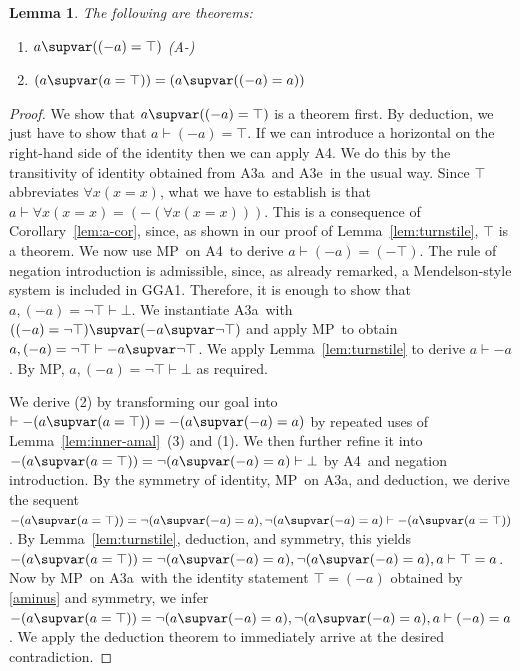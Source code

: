 \documentclass{preprint}
\makeatletter
\newtheorem{lemma}[theorem]{Lemma}
\newcommand{\GGA}{\textsf{GGA1}}
\newcommand{\iiia}{A3a}%
\newcommand{\iiie}{A3e}%
\newcommand{\iv}{A4}%
\renewcommand{\mp}{MP}%
\renewcommand{\to}{\supvar}
\newcommand\mytag[2][]{%
	\def\@currentlabel{#2}%
	(#2)\label{#1} %
}
\makeatother
\begin{document}
\begin{lemma} \label{lem:admissible} 
	The following are theorems:
	\begin{enumerate}
		\item $a \to ((- a) = \top)$ \mytag[aminus]{A-}%
		\item $(a \to (a = \top)) = (a \to ((-a) = a))$ 
	\end{enumerate}
\end{lemma}
\begin{proof}
	We show that $a \to ((- a) = \top)$ is a theorem first. 
	By deduction, we just have to show that $a \vdash (-a) = \top$. If we can introduce a horizontal on the right-hand side of the identity then we can apply \iv. 
	We do this by the transitivity of identity obtained from \iiia~and \iiie~in the usual way. 
	Since $\top$ abbreviates $\forall x (x = x)$, what we have to establish is that $a \vdash \forall x (x = x) = (-(\forall x (x = x)))$. This is a consequence of Corollary~\ref{lem:a-cor}, since, as shown in our proof of Lemma~\ref{lem:turnstile}, $\top$ is a theorem. 
	We now use \mp~on \iv~to derive $a \vdash (-a) = (-\top)$. 
	The rule of negation introduction is admissible, since, as already remarked, a Mendelson-style system is included in {\GGA}. 
	Therefore, it is enough to show that $a, (-a) = \neg \top \vdash \bot$. 
	We instantiate \iiia~with $((-a) = \neg \top) \to (-a \to \neg \top)$ and apply \mp~to obtain $a, (-a) = \neg \top \vdash -a \to \neg \top$. We apply Lemma~\ref{lem:turnstile} to derive $a \vdash -a$. By \mp, $a, (-a) = \neg \top \vdash \bot$ as required. 
	
	
	We derive (2) by transforming our goal into $\vdash -(a \to (a = \top)) = -(a \to (-a) = a)$ by repeated uses of Lemma~\ref{lem:inner-amal}~(3) and (1). We then further refine it into $-(a \to (a = \top)) = \neg (a \to (-a) = a) \vdash \bot $ by \iv~and negation introduction. By the symmetry of identity, \mp~on \iiia, and deduction, we derive the sequent $-(a \to (a = \top)) = \neg (a \to (-a) = a), \neg (a \to (-a) = a) \vdash -(a \to (a = \top))$. By Lemma~\ref{lem:turnstile}, deduction, and symmetry, this yields~$-(a \to (a = \top)) = \neg (a \to (-a) = a), \neg (a \to (-a) = a), a \vdash \top = a$. Now by \mp~on \iiia~with the identity statement $\top = (-a)$ obtained by \eqref{aminus} and symmetry, we infer 
	$-(a \to (a = \top)) = \neg (a \to (-a) = a), \neg (a \to (-a) = a), a \vdash (-a) = a$. We apply the deduction theorem to immediately arrive at the desired contradiction. 
\end{proof}
\end{document}
